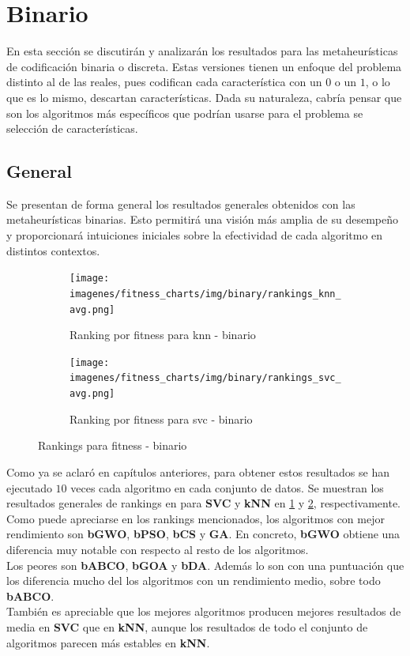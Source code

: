 \section{Binario}
En esta sección se discutirán y analizarán los resultados para las metaheurísticas de codificación binaria o discreta. Estas versiones tienen un enfoque del problema distinto al de las reales, pues codifican cada característica con un $0$ o un $1$, o lo que es lo mismo, descartan características. Dada su naturaleza, cabría pensar que son los algoritmos más específicos que podrían usarse para el problema se selección de características.

\subsection{General}
Se presentan de forma general los resultados generales obtenidos con las metaheurísticas binarias. Esto permitirá una visión más amplia de su desempeño y proporcionará intuiciones iniciales sobre la efectividad de cada algoritmo en distintos contextos.

\begin{figure}[htp]
    \centering
    \begin{subfigure}[htp]{1\textwidth}
        \texttt{[image: imagenes/fitness\_charts/img/binary/rankings\_knn\_avg.png]}
        \caption{Ranking por fitness para knn - binario}
        \label{fig:ranking_knn}
    \end{subfigure}
    \begin{subfigure}[htp]{1\textwidth}
        \texttt{[image: imagenes/fitness\_charts/img/binary/rankings\_svc\_avg.png]}
        \caption{Ranking por fitness para svc - binario}
        \label{fig:ranking_svc}
    \end{subfigure}
    \caption{Rankings para fitness - binario}
    \label{fig:rankings_binary}
\end{figure}

Como ya se aclaró en capítulos anteriores, para obtener estos resultados se han ejecutado $10$ veces cada algoritmo en cada conjunto de datos. Se muestran los resultados generales de rankings en para \textbf{SVC} y \textbf{kNN} en \ref{fig:ranking_knn} y \ref{fig:ranking_svc}, respectivamente.\\[6pt]
Como puede apreciarse en los rankings mencionados, los algoritmos con mejor rendimiento son \textbf{bGWO}, \textbf{bPSO}, \textbf{bCS} y \textbf{GA}. En concreto, \textbf{bGWO} obtiene una diferencia muy notable con respecto al resto de los algoritmos.\\[6pt]
Los peores son \textbf{bABCO}, \textbf{bGOA} y \textbf{bDA}. Además lo son con una puntuación que los diferencia mucho del los algoritmos con un rendimiento medio, sobre todo \textbf{bABCO}.\\[6pt]
También es apreciable que los mejores algoritmos producen mejores resultados de media en \textbf{SVC} que en \textbf{kNN}, aunque los resultados de todo el conjunto de algoritmos parecen más estables en \textbf{kNN}.

